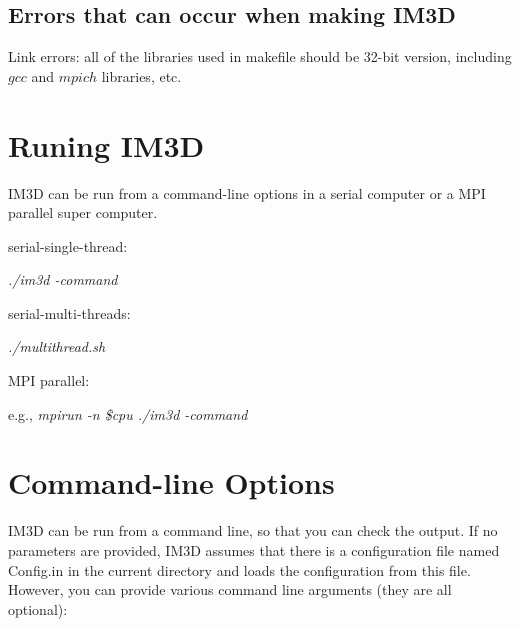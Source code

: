 \subsection{Errors that can occur when making IM3D}

Link errors: all of the libraries used in makefile should be 32-bit version, including $gcc$ and $mpich$ libraries, etc.

\section{Runing IM3D}

IM3D can be run from a command-line options in a serial computer or a MPI parallel super computer.

serial-single-thread:

\quad \textsl{./im3d -command}

serial-multi-threads:

\quad \textsl{./multithread.sh}

MPI parallel:

\quad e.g., \textsl{mpirun -n \$cpu ./im3d -command}


\section{Command-line Options}

IM3D can be run from a command line, so that you can check the output. If no parameters are provided, IM3D assumes that there is a configuration file named Config.in in the current directory and loads the configuration from this file. However, you can provide various command line arguments (they are all optional):

